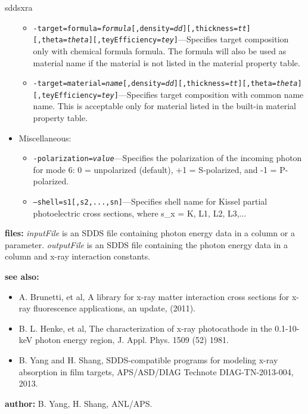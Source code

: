 \begin{sddsprog}{sddsxra}
\begin{itemize}
\begin{itemize}
      \item {\tt -target=formula={\em formula}[,density={\em dd}][,thickness={\em tt}][,theta={\em theta}][,teyEfficiency={\em tey}]}---Specifies target composition only with chemical formula formula. The formula will also be used as material name if the material is not listed in the material property table.
      \item {\tt -target=material={\em name}[,density={\em dd}][,thickness={\em tt}][,theta={\em theta}][,teyEfficiency={\em tey}]}---Specifies target composition with common name name. This is acceptable only for material listed in the built-in material property table.
    \end{itemize}
  \item Miscellaneous:
    \begin{itemize}
      \item {\tt -polarization={\em value}}---Specifies the polarization of the incoming photon for mode 6: 0 = unpolarized (default), +1 = S-polarized, and -1 = P-polarized.
      \item {\tt --shell=s1[,s2,...,sn]}---Specifies shell name for Kissel partial photoelectric cross sections, where s\_x = K, L1, L2, L3,...
    \end{itemize}
  \end{itemize}
\item \textbf{files:}
  {\em inputFile} is an SDDS file containing photon energy data in a column or a parameter. {\em outputFile} is an SDDS file containing the photon energy data in a column and x-ray interaction constants.
\item \textbf{see also:}
  \begin{itemize}
  \item A. Brunetti, et al, A library for x-ray matter interaction cross sections for x-ray fluorescence applications, an update, (2011).
  \item B. L. Henke, et al, The characterization of x-ray photocathode in the 0.1-10-keV photon energy region, J. Appl. Phys. 1509 (52) 1981.
  \item B. Yang and H. Shang, SDDS-compatible programs for modeling x-ray absorption in film targets, APS/ASD/DIAG Technote DIAG-TN-2013-004, 2013.
  \end{itemize}
\item \textbf{author:} B. Yang, H. Shang, ANL/APS.
\end{sddsprog}

